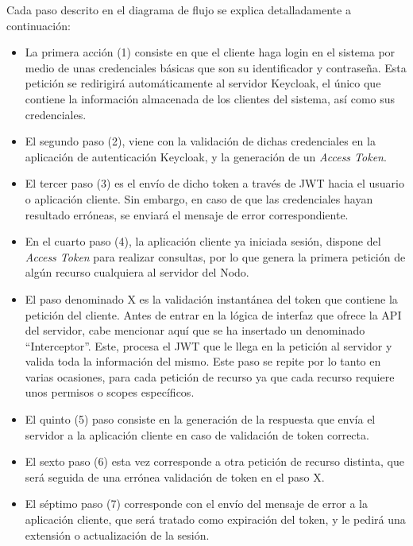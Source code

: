 Cada paso descrito en el diagrama de flujo se explica detalladamente a continuación: 

\begin{itemize}
	\item La primera acción (1) consiste en que el cliente haga login en el sistema por medio de unas credenciales básicas que son su identificador y contraseña. Esta petición se redirigirá automáticamente al servidor Keycloak, el único que contiene la información almacenada de los clientes del sistema, así como sus credenciales. 
	
	\item El segundo paso (2), viene con la validación de dichas credenciales en la aplicación de autenticación Keycloak, y la generación de un \textit{Access Token}.
	
	\item El tercer paso (3) es el envío de dicho token a través de JWT hacia el usuario o aplicación cliente. Sin embargo, en caso de que las credenciales hayan resultado erróneas, se enviará el mensaje de error correspondiente. 
	
	\item En el cuarto paso (4), la aplicación cliente ya iniciada sesión, dispone del \textit{Access Token} para realizar consultas, por lo que genera la primera petición de algún recurso cualquiera al servidor del Nodo.
	
	\item El paso denominado X es la validación instantánea del token que contiene la petición del cliente. Antes de entrar en la lógica de interfaz que ofrece la API del servidor, cabe mencionar aquí que se ha insertado un denominado “Interceptor”. Este, procesa el JWT que le llega en la petición al servidor y valida toda la información del mismo. Este paso se repite por lo tanto en varias ocasiones, para cada petición de recurso ya que cada recurso requiere unos permisos o scopes específicos. 
	
	\item El quinto (5) paso consiste en la generación de la respuesta que envía el servidor a la aplicación cliente en caso de validación de token correcta. 
	
	\item El sexto paso (6) esta vez corresponde a otra petición de recurso distinta, que será seguida de una errónea validación de token en el paso X.
	
	\item El séptimo paso (7) corresponde con el envío del mensaje de error a la aplicación cliente, que será tratado como expiración del token, y le pedirá una extensión o actualización de la sesión. 
	

\end{itemize}
